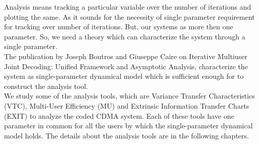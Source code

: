 Analysis means tracking a particular variable over the number of iterations and plotting the same. As it sounds for the necessity of single parameter requirement for tracking over number of iterations. But, our systems as more then one parameter. So, we need a theory which can characterize the system through a single parameter.  \\ 

The publication by Joseph Boutros and Giuseppe Caire on Iterative Multiuser Joint Decoding: Unified Framework and Asymptotic Analysis, characterize the system as single-parameter dynamical model which is sufficient enough for to construct the analysis tool. \\  

We study some of the analysis tools, which are Variance Transfer Characteristics (VTC), Multi-User Efficiency (MU) and Extrinsic Information Transfer Charts (EXIT) to analyze the coded CDMA system. Each of these tools have one parameter in common for all the users by which the single-parameter dynamical model holds. The details about the analysis tools are in the following chapters.
